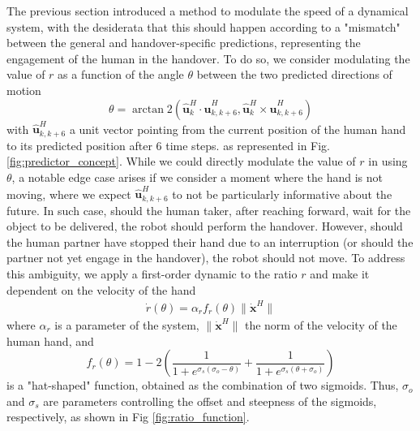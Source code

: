 \documentclass[lettersize,journal]{IEEEtran}
\newcommand{\xd}{\dot{\bm x}}
\begin{document}
The previous section introduced a method to modulate the speed of a dynamical system, with the desiderata that this should happen according to a "mismatch" between the general and handover-specific predictions, representing the engagement of the human in the handover.
To do so, we consider modulating the value of $r$ as a function of the angle $\theta$ between the two predicted directions of motion
\begin{equation}
    \theta = \arctan2(\hat{\bm u}_{k}^H \cdot \hat{\bm u}_{k,k+6}^H, \hat{\bm u}_{k}^H \times \hat{\bm u}_{k,k+6}^H)
\end{equation}
with $\hat{\bm u}_{k,k+6}^H$ a unit vector pointing from the current position of the human hand to its predicted position after 6 time steps.
as represented in Fig. \ref{fig:predictor_concept}.
While we could directly modulate the value of $r$ in using $\theta$, a notable edge case arises if we consider a moment where the hand is not moving, where we expect $\hat{\bm u}_{k,k+6}^H$ to not be particularly informative about the future.
In such case, should the human taker, after reaching forward, wait for the object to be delivered, the robot should perform the handover.
However, should the human partner have stopped their hand due to an interruption (or should the partner not yet engage in the handover), the robot should not move.
To address this ambiguity, we apply a first-order dynamic to the ratio $r$ and make it dependent on the velocity of the hand
\begin{align}
    \dot r(\theta) = \alpha_r f_{r}(\theta) \|\xd^H\|
\end{align}
where $\alpha_r$ is a parameter of the system, $\|\xd^H\|$ the norm of the velocity of the human hand, and
\begin{equation}
    f_r(\theta) = 1-2\left( \frac{1}{1+e^{\sigma_{s}(\sigma_{o}-\theta)}} + \frac{1}{1+e^{\sigma_{s}(\theta+\sigma_{o})}} \right)
\label{eq:ratio_function}
\end{equation}
is a "hat-shaped" function, obtained as the combination of two sigmoids.
Thus, $\sigma_o$ and $\sigma_s$ are parameters controlling the offset and steepness of the sigmoids, respectively, as shown in Fig \ref{fig:ratio_function}.
\end{document}
